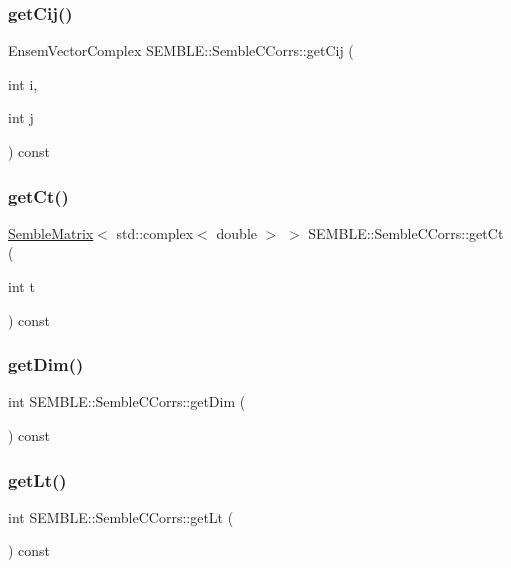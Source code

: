 \subsubsection{\texorpdfstring{getCij()}{getCij()}}
{\footnotesize\ttfamily Ensem\+Vector\+Complex S\+E\+M\+B\+L\+E\+::\+Semble\+C\+Corrs\+::get\+Cij (\begin{DoxyParamCaption}\item[{int}]{i,  }\item[{int}]{j }\end{DoxyParamCaption}) const}

\mbox{\label{classSEMBLE_1_1SembleCCorrs_a800db1b6b985a3064c3adc0fa85aac0b}} 
\subsubsection{\texorpdfstring{getCt()}{getCt()}}
{\footnotesize\ttfamily \mbox{\hyperlink{structSEMBLE_1_1SembleMatrix}{Semble\+Matrix}}$<$ std\+::complex$<$ double $>$ $>$ S\+E\+M\+B\+L\+E\+::\+Semble\+C\+Corrs\+::get\+Ct (\begin{DoxyParamCaption}\item[{int}]{t }\end{DoxyParamCaption}) const}

\mbox{\label{classSEMBLE_1_1SembleCCorrs_ac3f37c3af38d763addbec0cdb86d6117}} 
\subsubsection{\texorpdfstring{getDim()}{getDim()}}
{\footnotesize\ttfamily int S\+E\+M\+B\+L\+E\+::\+Semble\+C\+Corrs\+::get\+Dim (\begin{DoxyParamCaption}{ }\end{DoxyParamCaption}) const}

\mbox{\label{classSEMBLE_1_1SembleCCorrs_aac492c18afa3475a688db0ffa4d27ff6}} 
\subsubsection{\texorpdfstring{getLt()}{getLt()}}
{\footnotesize\ttfamily int S\+E\+M\+B\+L\+E\+::\+Semble\+C\+Corrs\+::get\+Lt (\begin{DoxyParamCaption}{ }\end{DoxyParamCaption}) const}

